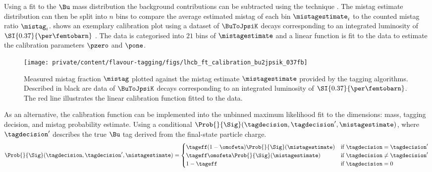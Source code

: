 Using a fit to the $\Bu$ mass distribution the background contributions can be
subtracted using the \sPlot technique \cite{Pivk:2004ty}. The mistag estimate
distribution can then be split into $n$ bins to compare the average estimated
mistag of each bin $\mistagestimate_i$ to the counted mistag ratio $\mistag_i$.
 shows an
exemplary calibration plot using a dataset of $\BuToJpsiK$ decays corresponding
to an integrated luminosity of $\SI{0.37}{\per\femtobarn}$ \cite{Aaij:2012mu}.
The data is categorised into $\num{21}$ bins of $\mistagestimate$ and a linear
function is fit to the data to estimate the calibration parameters $\pzero$ and
$\pone$.
%
\begin{figure}
\centering
\texttt{[image: private/content/flavour-tagging/figs/lhcb\_ft\_calibration\_bu2jpsik\_037fb]}
\caption{Measured mistag fraction $\mistag$ plotted against the mistag estimate
$\mistagestimate$ provided by the tagging algorithms. Described in black are
data of $\BuToJpsiK$ decays corresponding to an integrated luminosity of
$\SI{0.37}{\per\femtobarn}$. The red line illustrates the linear calibration
function fitted to the data. \cite{Aaij:2012mu}}
\label{fig:flavour_tagging:calibration:method:charged:calibration_plot}
\end{figure}

As an alternative, the calibration function can be implemented into the unbinned
maximum likelihood fit to the dimensions: mass, tagging decision, and mistag
probability estimate. Using a conditional \PDF
$\Prob{}{\Sig}(\tagdecision,\tagdecision^\prime,\mistagestimate)$, where
$\tagdecision^\prime$ describes the true $\Bu$ tag derived from the final-state
particle charge.
%
\begin{equation}\label{eq:flavour_tagging:calibration:method:charged:tagdefinition}
  \Prob{}{\Sig}(\tagdecision,\tagdecision^\prime,\mistagestimate) = 
  \begin{cases}
        \tageff (1-\omofeta) \Prob{}{\Sig}(\mistagestimate)    & \text{if $\tagdecision =    \tagdecision^\prime$} \\
        \tageff    \omofeta  \Prob{}{\Sig}(\mistagestimate)    & \text{if $\tagdecision \neq \tagdecision^\prime$} \\
    1 - \tageff                                                & \text{if $\tagdecision = 0$} \\
  \end{cases}
\end{equation}
%

